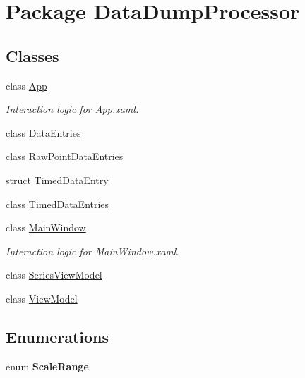 \hypertarget{namespace_data_dump_processor}{\section{Package Data\-Dump\-Processor}
\label{namespace_data_dump_processor}
}
\subsection*{Classes}
\begin{DoxyCompactItemize}
\item 
class \hyperlink{class_data_dump_processor_1_1_app}{App}
\begin{DoxyCompactList}\small\item\em Interaction logic for App.\-xaml. \end{DoxyCompactList}\item 
class \hyperlink{class_data_dump_processor_1_1_data_entries}{Data\-Entries}
\item 
class \hyperlink{class_data_dump_processor_1_1_raw_point_data_entries}{Raw\-Point\-Data\-Entries}
\item 
struct \hyperlink{struct_data_dump_processor_1_1_timed_data_entry}{Timed\-Data\-Entry}
\item 
class \hyperlink{class_data_dump_processor_1_1_timed_data_entries}{Timed\-Data\-Entries}
\item 
class \hyperlink{class_data_dump_processor_1_1_main_window}{Main\-Window}
\begin{DoxyCompactList}\small\item\em Interaction logic for Main\-Window.\-xaml. \end{DoxyCompactList}\item 
class \hyperlink{class_data_dump_processor_1_1_series_view_model}{Series\-View\-Model}
\item 
class \hyperlink{class_data_dump_processor_1_1_view_model}{View\-Model}
\end{DoxyCompactItemize}
\subsection*{Enumerations}
\begin{DoxyCompactItemize}
\item 
enum {\bfseries Scale\-Range} 
\end{DoxyCompactItemize}
